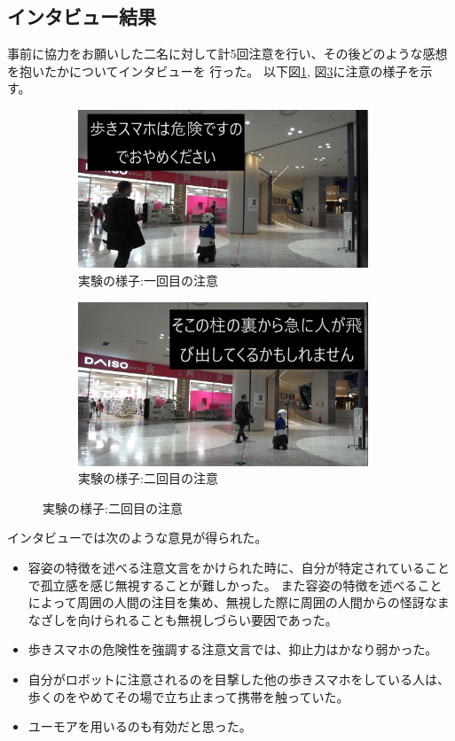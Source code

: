 \documentclass{kuisthesis}
\begin{document}
\subsection{インタビュー結果}
事前に協力をお願いした二名に対して計5回注意を行い、その後どのような感想を抱いたかについてインタビューを
行った。
以下図\ref{fig: Experimentjani}, 図\ref{fig: Experimentjani2}に注意の様子を示す。
\begin{figure}[H]

  \begin{subfigure}{0.5\textwidth}
    \centering
    \includegraphics[width=0.95\textwidth]{img/jani2.png}
    \caption{実験の様子:一回目の注意}
    \label{fig: Experimentjani}
  \end{subfigure}
  \begin{subfigure}{0.5\textwidth}
    \centering
    \includegraphics[width=0.95\textwidth]{img/jani3.png}
    \caption{実験の様子:二回目の注意}
    \label{fig: Experimentjani2}
  \end{subfigure}
\end{figure}
インタビューでは次のような意見が得られた。
\begin{itemize}
  \item 容姿の特徴を述べる注意文言をかけられた時に、自分が特定されていることで孤立感を感じ無視することが難しかった。
        また容姿の特徴を述べることによって周囲の人間の注目を集め、無視した際に周囲の人間からの怪訝なまなざしを向けられることも無視しづらい要因であった。
  \item 歩きスマホの危険性を強調する注意文言では、抑止力はかなり弱かった。
  \item 自分がロボットに注意されるのを目撃した他の歩きスマホをしている人は、歩くのをやめてその場で立ち止まって携帯を触っていた。
  \item ユーモアを用いるのも有効だと思った。
\end{itemize}
\end{document}
